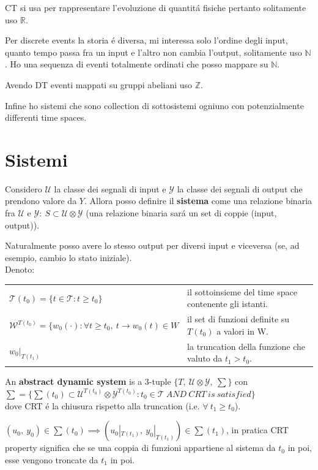 CT si usa per rappresentare l'evoluzione di quantit\'a fisiche pertanto solitamente uso $\mathbb{R}$.

Per discrete events la storia \'e diversa, mi interessa solo l'ordine degli input, quanto tempo passa fra un input e l'altro non cambia l'output, solitamente uso 
$\mathbb{N}$. Ho una sequenza di eventi totalmente ordinati che posso mappare su $\mathbb{N}$.

Avendo DT eventi mappati su gruppi abeliani uso $\mathbb{Z}$.

Infine ho sistemi che sono collection di sottosistemi ogniuno con potenzialmente differenti time spaces.

\chapter{Sistemi}
\begin{tcolorbox}\begin{center}
    Considero $\mathcal{U}$ la classe dei segnali di input e $\mathcal{Y}$ la classe dei segnali di output che prendono valore da $Y$. Allora posso definire 
    il \textbf{sistema} come una relazione binaria fra $\mathcal{U}$ e $\mathcal{Y} :\ S \subset \mathcal{U} \otimes \mathcal{Y}$ (una relazione binaria sar\'a un set di 
    coppie (input, output)). 
\end{center}\end{tcolorbox}

Naturalmente posso avere lo stesso output per diversi input e viceversa (se, ad esempio, cambio lo stato iniziale).\\[5pt]

Denoto:
\begin{center}
    \begin{tabular}{ll}
        $\mathcal{T}(t_0) = \{ t \in \mathcal{T}: t \geq t_0 \}$ & il sottoinsieme del time space contenente gli istanti.\\
        $\mathcal{W}^{T(t_0)} = \{ w_0(\cdot) : \forall t \geq t_0,\ t \rightarrow w_0(t) \in W$ & il set di funzioni definite su $T(t_0)$ a valori in W.\\
        $w_0|_{T(t_1)}$ & la truncation della funzione che valuto da $t_1 > t_0$.\\
    \end{tabular}
\end{center}

\begin{tcolorbox}\begin{center}
    An \textbf{abstract dynamic system} is a 3-tuple $\{ T,\ \mathcal{U} \otimes \mathcal{Y},\ \sum \}$ con \\[5pt]
    $\sum = \{ \sum (t_0) \subset \mathcal{U}^{T(t_0)} \otimes \mathcal{Y}^{T(t_0)}: t_0 \in \mathcal{T}\ AND\ CRT\ is\ satisfied\}$ \\[5pt]
    dove CRT \'e la chiusura rispetto alla truncation (i.e. $\forall\ t_1 \geq t_0$).
\end{center}\end{tcolorbox}
$(u_0,\ y_0) \in \sum (t_0) \implies (u_0|_{T(t_1)},\ y_0|_{T(t_1)}) \in \sum (t_1)$, in pratica CRT property significa che se una coppia di funzioni appartiene al sistema 
da $t_0$ in poi, esse vengono troncate da $t_1$ in poi.


